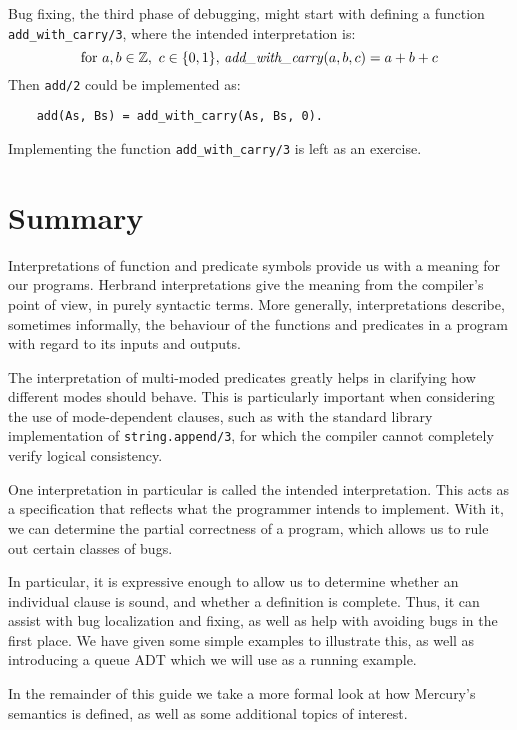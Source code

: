 \label{end:decl-debug}

Bug fixing,
the third phase of debugging,
might start with defining a function \texttt{add\_with\_carry/3},
where the intended interpretation is:
\[
    \text{for }a, b \in \mathbb{Z},\ c \in \{0, 1\},
        \,\text{\textit{add\_with\_carry}}(a, b, c) = a + b + c
\]
Then \texttt{add/2} could be implemented as:
\begin{verbatim}
    add(As, Bs) = add_with_carry(As, Bs, 0).
\end{verbatim}
Implementing the function \texttt{add\_with\_carry/3} is left as an exercise.

\section{Summary}

Interpretations of function and predicate symbols
provide us with a meaning for our programs.
Herbrand interpretations give the meaning
from the compiler's point of view,
in purely syntactic terms.
More generally, interpretations describe,
sometimes informally,
the behaviour of the functions and predicates in a program
with regard to its inputs and outputs.

The interpretation of multi-moded predicates
greatly helps in clarifying how different modes should behave.
This is particularly important when
considering the use of mode-dependent clauses,
such as with the standard library implementation of \texttt{string.append/3},
for which the compiler cannot completely verify logical consistency.

One interpretation in particular
is called the intended interpretation.
This acts as a specification
that reflects what the programmer intends to implement.
With it, we can determine the partial correctness of a program,
which allows us to rule out certain classes of bugs.

In particular,
it is expressive enough to allow us to determine
whether an individual clause is sound,
and whether a definition is complete.
Thus, it can assist with bug localization and fixing,
as well as help with avoiding bugs in the first place.
We have given some simple examples to illustrate this,
as well as introducing a queue ADT
which we will use as a running example.

In the remainder of this guide
we take a more formal look at
how Mercury's semantics is defined,
as well as some additional topics of interest.
